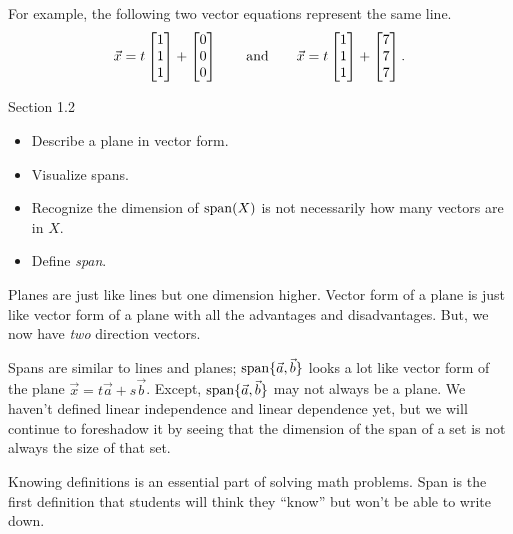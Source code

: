 \documentclass{problemset}
\newcommand{\bookonlynewpage}{\begin{bookonly}\newpage\end{bookonly}}
\begin{document}
\begin{parts}
\begin{solution}
				For example, the following two vector equations represent the
				same line.
				\[
					\vec x = t \mat{1\\1\\1} + \mat{0\\0\\0}
					\qquad \text{and} \qquad
					\vec x = t \mat{1\\1\\1} + \mat{7\\7\\7}.
				\]
			\end{solution}
	\end{parts}


\begin{lesson}

	Section 1.2

	\begin{itemize}
		\item Describe a plane in vector form.
		\item Visualize spans.
		\item Recognize the dimension of $\operatorname{span}(X)$ is not necessarily how many vectors
			are in $X$.
		\item Define \emph{span}.
	\end{itemize}

	Planes are just like lines but one dimension higher. Vector form of a plane is just like
	vector form of a plane with all the advantages and disadvantages. But, we now have
	\emph{two} direction vectors.

	Spans are similar to lines and planes; $\operatorname{span}\{\vec a,\vec b\}$ looks a lot like
	vector form of the plane
	$\vec x=t\vec a+s\vec b$. Except, $\operatorname{span}\{\vec a,\vec b\}$ may not always be a plane.
	We haven't defined linear independence and linear dependence yet, but we will continue to
	foreshadow it by seeing that the dimension of the span of a set is not always the size of
	that set.

	Knowing definitions is an essential part of solving math problems. Span is
	the first definition that students will think they ``know'' but won't be
	able to write down.

\end{lesson}

	\bookonlynewpage
\end{document}

